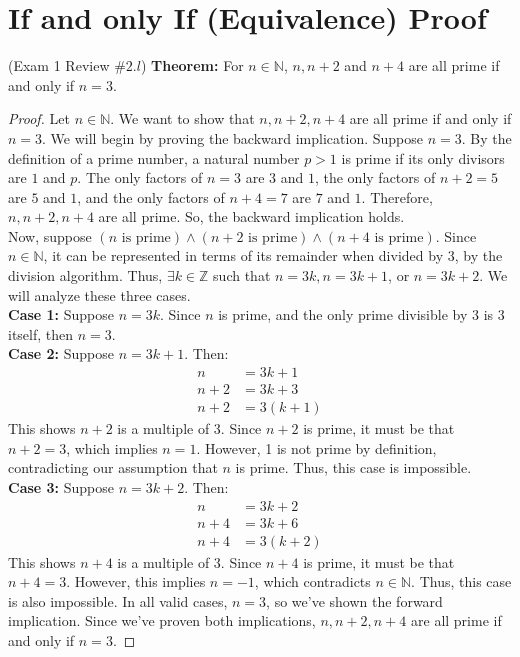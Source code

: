 \documentclass[12pt]{amsart}
\newcommand{\N}{\ensuremath{\mathbb{N}}}
\begin{document}
\section{If and only If (Equivalence) Proof}
{(Exam 1 Review $\#2.l$) }
\textbf{Theorem:}{ For $n \in \mathbb{N}$, $n, n+2$ and $n+4$ are all prime if and only if $n=3$.}
\begin{proof}
Let $n \in \N$. We want to show that $n,n+2,n+4$ are all prime if and only if $n = 3$. We will begin by proving the backward implication. Suppose $n = 3$. By the definition of a prime number, a natural number $p > 1$ is prime if its only divisors are $1$ and $p$. The only factors of $n = 3$ are $3$ and $1$, the only factors of $n+2 = 5$ are $5$ and $1$, and the only factors of $n+4 = 7$ are $7$ and $1$. Therefore, $n, n+2,n+4$ are all prime. So, the backward implication holds. \\ Now, suppose $(n\text{ is prime}) \wedge (n+2\text{ is prime}) \wedge (n+4\text{ is prime})$. Since $n \in \N$, it can be represented in terms of its remainder when divided by 3, by the division algorithm. Thus, $\exists k \in \mathbb{Z}$ such that $n = 3k, n =3k+1$, or $n=3k+2$. We will analyze these three cases. \\
\textbf{Case 1:} Suppose $n = 3k$. Since $n$ is prime, and the only prime divisible by 3 is 3 itself, then $n = 3$. \\
\textbf{Case 2:} Suppose $n = 3k+1$. Then:
\begin{align*}
n &= 3k+1 \\
n + 2 &= 3k+3 \\
n + 2 &= 3(k+1)
\end{align*}
This shows $n+2$ is a multiple of 3. Since $n+2$ is prime, it must be that $n+2=3$, which implies $n=1$. However, 1 is not prime by definition, contradicting our assumption that $n$ is prime. Thus, this case is impossible.\\
\textbf{Case 3:} Suppose $n = 3k+2$. Then:
\begin{align*}
n &= 3k+2 \\
n + 4 &= 3k+6 \\
n + 4 &= 3(k+2)
\end{align*}
This shows $n+4$ is a multiple of 3. Since $n+4$ is prime, it must be that $n + 4 =3$. However, this implies $n=-1$, which contradicts $n \in \N$. Thus, this case is also impossible. In all valid cases, $n = 3$, so we've shown the forward implication. Since we've proven both implications, $n, n+2, n+4$ are all prime if and only if $n = 3$.
\end{proof}
\newpage
\end{document}
